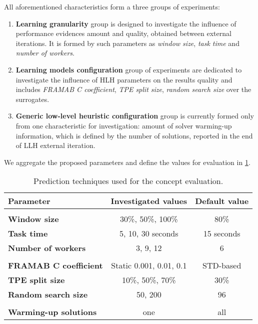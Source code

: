 All aforementioned characteristics form a three groups of experiments:
\begin{enumerate}
	\item \textbf{Learning granularity} group is designed to investigate the influence of performance evidences amount and quality, obtained between external iterations. It is formed by such parameters as \emph{window size}, \emph{task time} and \emph{number of workers}.
	
	\item \textbf{Learning models configuration} group of experiments are dedicated to investigate the influence of HLH parameters on the results quality and includes \emph{FRAMAB C coefficient}, \emph{TPE split size}, \emph{random search size} over the surrogates.
	
	\item \textbf{Generic low-level heuristic configuration} group is currently formed only from one characteristic for investigation: amount of solver warming-up information, which is defined by the number of solutions, reported in the end of LLH external iteration.
\end{enumerate}

We aggregate the proposed parameters and define the values for evaluation in \cref{eval:2: planning table}.

\begin{table}[h!]
	\centering
	\begin{tabular}{l||c|c}
		\textbf{Parameter} & \textbf{Investigated values} & \textbf{Default value} \\
		\hline
		\hline
		\rowcolor{gray!10}
		\multicolumn{3}{c}{Learning granularity} \\
		\textbf{Window size} & 30\%, 50\%, 100\% & 80\% \\
		\textbf{Task time} & 5, 10, 30 seconds & 15 seconds \\
		\textbf{Number of workers} & 3, 9, 12 & 6 \\
		\rowcolor{gray!10}
		\multicolumn{3}{c}{Learning models configuration} \\
		\textbf{FRAMAB C coefficient} & Static 0.001, 0.01, 0.1 & STD-based \\
		\textbf{TPE split size} & 10\%, 50\%, 70\% & 30\% \\
		\textbf{Random search size} & 50, 200 & 96 \\
		\rowcolor{gray!10}
		\multicolumn{3}{c}{Generic LLH configuration} \\
		\textbf{Warming-up solutions} & one & all
	\end{tabular}
	\caption{Prediction techniques used for the concept evaluation.}
	\label{eval:2: planning table}
\end{table}

